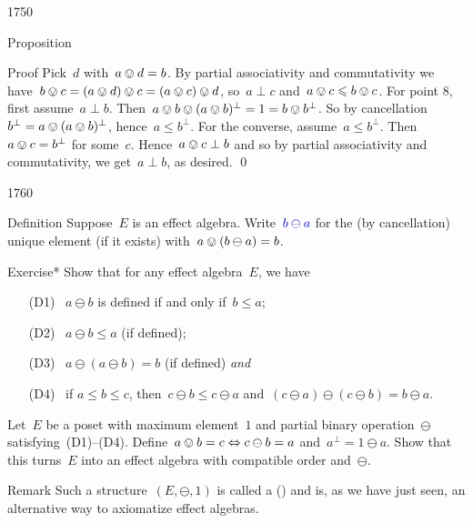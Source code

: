 \begin{parsec}{1750}
\begin{point}{50}{Proposition}
\begin{point}{60}{Proof}
Pick~$d$ with~$a \ovee d = b$.
By partial associativity and commutativity
    we have~$b \ovee c = (a \ovee d) \ovee c = (a \ovee c) \ovee d$,
    so~$a \perp c$ and~$a \ovee c \leq b \ovee c$.
For point 8, first assume~$a \perp b$.
Then~$a \ovee b \ovee (a \ovee b)^\perp = 1 = b \ovee b^\perp$.
So by cancellation~$b^\perp = a \ovee (a \ovee b)^\perp$,
hence~$a \leq b^\perp$.
For the converse, assume~$a \leq b^\perp$.
Then~$a \ovee c = b^\perp$ for some~$c$.
Hence~$a \ovee c \perp b$
    and so  by partial associativity and commutativity,
        we get~$a \perp b$, as desired.
    \qed
\end{point}
\end{point}
\end{parsec}%

\begin{parsec}{1760}%
\begin{point}{10}{Definition}%
Suppose~$E$ is an effect algebra.
Write~$\Define{b \ominus a}$
for the (by cancellation) unique element (if it exists)
with~$a \ovee (b \ominus a) = b$.
\end{point}
\begin{point}{20}{Exercise*}%
Show that for any effect algebra~$E$, we have
\begin{enumerate}
    \item[(D1)]~$a \ominus b$ is defined if and only if~$b \leq a$;
    \item[(D2)]~$a \ominus b \leq a$ (if defined);
    \item[(D3)]~$a \ominus (a \ominus b) = b$ (if defined) \emph{and}
    \item[(D4)]~if $a \leq b \leq c $,
                then~$c \ominus b \leq c \ominus a$
                and~$(c \ominus a) \ominus (c \ominus b) = b \ominus a$.
\end{enumerate}
\begin{point}{30}%
Let~$E$ be a poset with maximum element~$1$
    and partial binary operation~$\ominus$
    satisfying~(D1)--(D4).
Define~$a \ovee b = c \Leftrightarrow c \ominus b = a$
    and~$a^\perp = 1 \ominus a$.
Show that this turns~$E$ into an effect algebra
    with compatible order and~$\ominus$.
\end{point}
\begin{point}{40}{Remark}%
    Such a structure~$(E,\ominus,1)$ is called a 
    () \cite{kopka1994d} and is, as we have just seen,
    an alternative way to axiomatize effect algebras.
\end{point}
\end{point}


\end{parsec}
